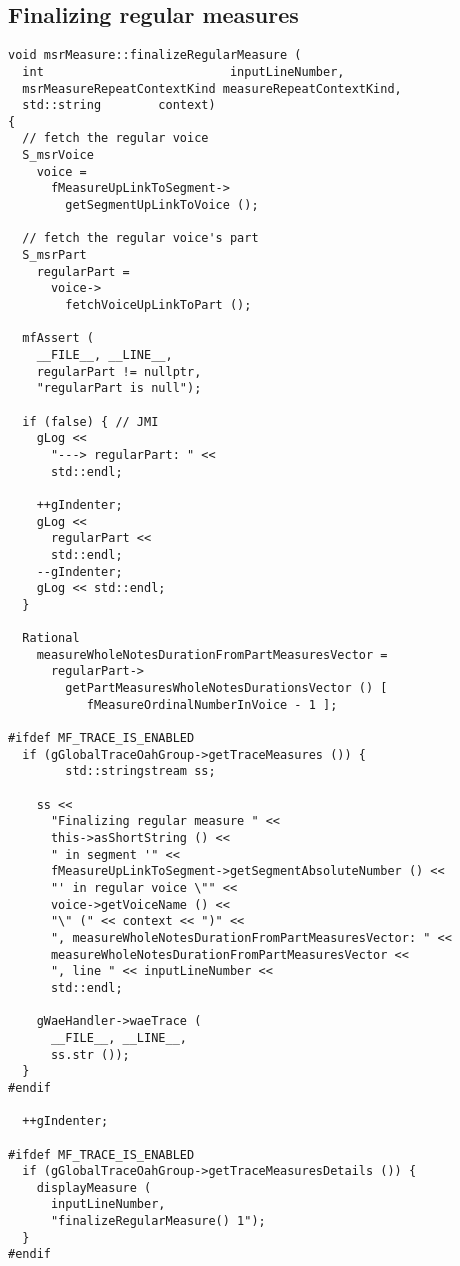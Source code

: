 \subsection{Finalizing regular measures}

\begin{lstlisting}[language=CPlusPlus]
void msrMeasure::finalizeRegularMeasure (
  int                          inputLineNumber,
  msrMeasureRepeatContextKind measureRepeatContextKind,
  std::string        context)
{
  // fetch the regular voice
  S_msrVoice
    voice =
      fMeasureUpLinkToSegment->
        getSegmentUpLinkToVoice ();

  // fetch the regular voice's part
  S_msrPart
    regularPart =
      voice->
        fetchVoiceUpLinkToPart ();

  mfAssert (
    __FILE__, __LINE__,
    regularPart != nullptr,
    "regularPart is null");

  if (false) { // JMI
    gLog <<
      "---> regularPart: " <<
      std::endl;

    ++gIndenter;
    gLog <<
      regularPart <<
      std::endl;
    --gIndenter;
    gLog << std::endl;
  }

  Rational
    measureWholeNotesDurationFromPartMeasuresVector =
      regularPart->
        getPartMeasuresWholeNotesDurationsVector () [
           fMeasureOrdinalNumberInVoice - 1 ];

#ifdef MF_TRACE_IS_ENABLED
  if (gGlobalTraceOahGroup->getTraceMeasures ()) {
		std::stringstream ss;

    ss <<
      "Finalizing regular measure " <<
      this->asShortString () <<
      " in segment '" <<
      fMeasureUpLinkToSegment->getSegmentAbsoluteNumber () <<
      "' in regular voice \"" <<
      voice->getVoiceName () <<
      "\" (" << context << ")" <<
      ", measureWholeNotesDurationFromPartMeasuresVector: " <<
      measureWholeNotesDurationFromPartMeasuresVector <<
      ", line " << inputLineNumber <<
      std::endl;

    gWaeHandler->waeTrace (
      __FILE__, __LINE__,
      ss.str ());
  }
#endif

  ++gIndenter;

#ifdef MF_TRACE_IS_ENABLED
  if (gGlobalTraceOahGroup->getTraceMeasuresDetails ()) {
    displayMeasure (
      inputLineNumber,
      "finalizeRegularMeasure() 1");
  }
#endif


\end{lstlisting}
